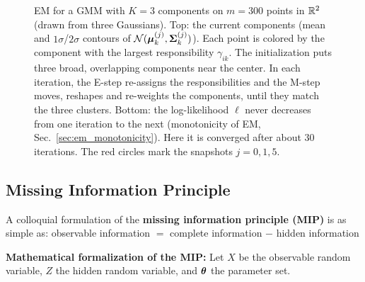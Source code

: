 \begin{figure}[htbp]
    \vspace{2mm}
    \caption{EM for a GMM with $K=3$ components on $m=300$ points in $\mathbb{R}^2$ (drawn from three Gaussians). Top: the current components (mean and $1\sigma$/$2\sigma$ contours of $\mathcal N(\bm{\mathrm{\mu}}_k^{(j)},\mathbf{\Sigma}_k^{(j)})$). Each point is colored by the component with the largest responsibility $\gamma_{ik}$. The initialization puts three broad, overlapping components near the center. In each iteration, the E-step re-assigns the responsibilities and the M-step moves, reshapes and re-weights the components, until they match the three clusters. Bottom: the log-likelihood $\ell$ never decreases from one iteration to the next (monotonicity of EM, Sec.~\ref{sec:em_monotonicity}). Here it is converged after about $30$ iterations. The red circles mark the snapshots $j=0,1,5$.}
    \label{fig:em_gmm}
  \end{figure}


\subsection{Missing Information Principle}

  A colloquial formulation of the   \textbf{missing information principle (MIP)} is as simple as:  observable information $=$ complete information $-$ hidden information

     
\textbf{Mathematical formalization of the MIP:}
  Let $X$ be the observable random variable, $Z$ the hidden random variable, and $\bm{\theta}$ the parameter set.
   
